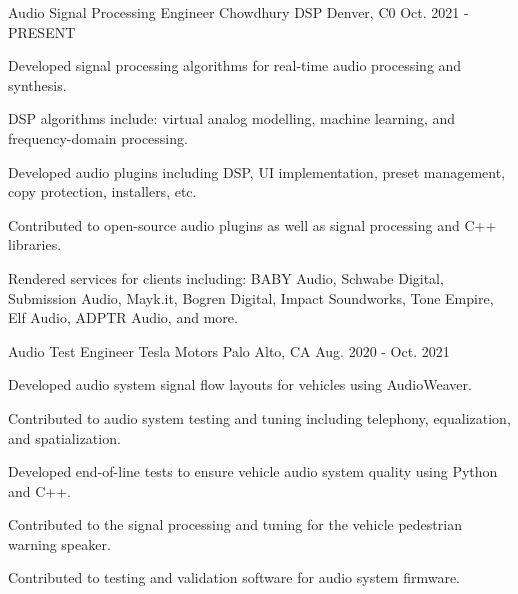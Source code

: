 

\begin{cventries}

  \cventry
    {Audio Signal Processing Engineer} %
    {Chowdhury DSP} %
    {Denver, C0} %
    {Oct. 2021 - PRESENT} %
    {
      \begin{cvitems} %
        \item {Developed signal processing algorithms for real-time audio processing and synthesis.}
        \item {DSP algorithms include: virtual analog modelling, machine learning, and frequency-domain processing.}
        \item {Developed audio plugins including DSP, UI implementation, preset management, copy protection, installers, etc.}
        \item {Contributed to open-source audio plugins as well as signal processing and C++ libraries.}
        \item {Rendered services for clients including: BABY Audio, Schwabe Digital, Submission Audio, Mayk.it, Bogren Digital,
               Impact Soundworks, Tone Empire, Elf Audio, ADPTR Audio, and more.}
      \end{cvitems}
    }

  \cventry
    {Audio Test Engineer} %
    {Tesla Motors} %
    {Palo Alto, CA} %
    {Aug. 2020 - Oct. 2021} %
    {
      \begin{cvitems} %
        \item {Developed audio system signal flow layouts for vehicles using AudioWeaver.}
        \item {Contributed to audio system testing and tuning including telephony, equalization, and spatialization.}
        \item {Developed end-of-line tests to ensure vehicle audio system quality using Python and C++.}
        \item {Contributed to the signal processing and tuning for the vehicle pedestrian warning speaker.}
        \item {Contributed to testing and validation software for audio system firmware.}
      \end{cvitems}
    }


\end{cventries}

